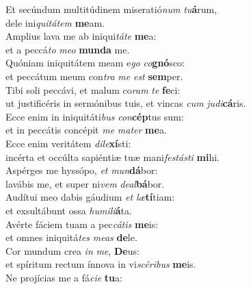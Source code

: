 \evenverse Et secúndum multitúdinem miseratió\textit{num} \textit{tu}\textbf{á}rum,~\*\\
\evenverse dele ini\textit{qui}\textit{tá}\textit{tem} \textbf{me}am.\\
\oddverse Amplius lava me ab iniqui\textit{tá}\textit{te} \textbf{me}a:~\*\\
\oddverse et a peccá\textit{to} \textit{me}\textit{o} \textbf{mun}\textbf{da} me.\\
\evenverse Quóniam iniquitátem meam e\textit{go} \textit{co}\textbf{gnó}sco:~\*\\
\evenverse et peccátum meum con\textit{tra} \textit{me} \textit{est} \textbf{sem}per.\\
\oddverse Tibi soli peccávi, et malum co\textit{ram} \textit{te} \textbf{fe}ci:~\*\\
\oddverse ut justificéris in sermónibus tuis, et vincas \textit{cum} \textit{ju}\textit{di}\textbf{cá}ris.\\
\evenverse Ecce enim in iniquitáti\textit{bus} \textit{con}\textbf{cép}tus sum:~\*\\
\evenverse et in peccátis concépit \textit{me} \textit{ma}\textit{ter} \textbf{me}a.\\
\oddverse Ecce enim veritátem \textit{di}\textit{le}\textbf{xí}sti:~\*\\
\oddverse incérta et occúlta sapiéntiæ tuæ mani\textit{fe}\textit{stá}\textit{sti} \textbf{mi}hi.\\
\evenverse Aspérges me hyssópo, \textit{et} \textit{mun}\textbf{dá}bor:~\*\\
\evenverse lavábis me, et super ni\textit{vem} \textit{de}\textit{al}\textbf{bá}bor.\\
\oddverse Audítui meo dabis gáudium \textit{et} \textit{læ}\textbf{tí}tiam:~\*\\
\oddverse et exsultábunt ossa \textit{hu}\textit{mi}\textit{li}\textbf{á}ta.\\
\evenverse Avérte fáciem tuam a pec\textit{cá}\textit{tis} \textbf{me}is:~\*\\
\evenverse et omnes iniquitá\textit{tes} \textit{me}\textit{as} \textbf{de}le.\\
\oddverse Cor mundum crea \textit{in} \textit{me}, \textbf{De}us:~\*\\
\oddverse et spíritum rectum ínnova in vi\textit{scé}\textit{ri}\textit{bus} \textbf{me}is.\\
\evenverse Ne projícias me a fá\textit{ci}\textit{e} \textbf{tu}a:~\*\\
